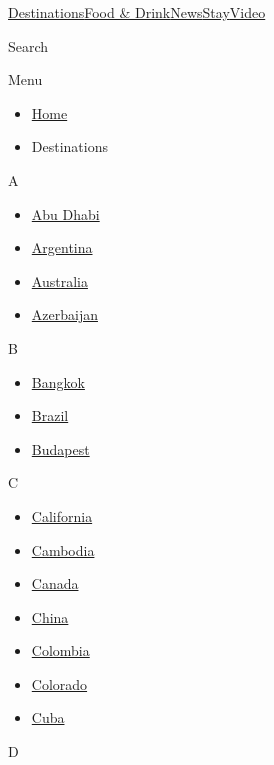 \href{/}{}\href{/travel}{}

\href{/travel/destinations}{Destinations}\href{/travel/food-and-drink}{Food
\&
Drink}\href{/travel/news}{News}\href{/travel/stay}{Stay}\href{/travel/videos}{Video}

Search

Menu

\begin{itemize}
\tightlist
\item
  \href{/travel}{Home}
\item
  Destinations
\end{itemize}

A

\begin{itemize}
\tightlist
\item
  \href{/travel/destinations/abu-dhabi}{Abu Dhabi}
\item
  \href{/travel/destinations/argentina}{Argentina}
\item
  \href{/travel/destinations/australia}{Australia}
\item
  \href{/travel/destinations/azerbaijan}{Azerbaijan}
\end{itemize}

B

\begin{itemize}
\tightlist
\item
  \href{/travel/destinations/bangkok/}{Bangkok}
\item
  \href{/travel/destinations/brazil}{Brazil}
\item
  \href{/travel/destinations/budapest}{Budapest}
\end{itemize}

C

\begin{itemize}
\tightlist
\item
  \href{/travel/destinations/california}{California}
\item
  \href{/travel/destinations/cambodia}{Cambodia}
\item
  \href{/travel/destinations/canada}{Canada}
\item
  \href{/travel/destinations/china}{China}
\item
  \href{/travel/destinations/colombia}{Colombia}
\item
  \href{/travel/destinations/colorado}{Colorado}
\item
  \href{/travel/destinations/cuba}{Cuba}
\end{itemize}

D

